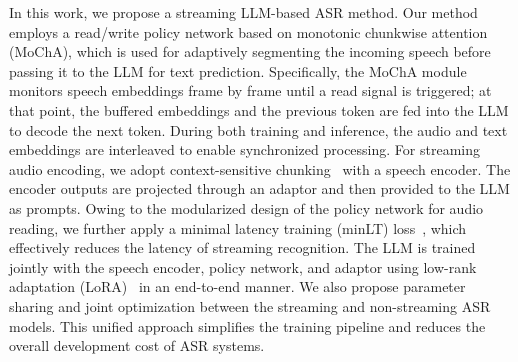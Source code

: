 \documentclass{article}
\begin{document}
In this work, we propose a streaming LLM-based ASR method. Our method employs a read/write policy network based on monotonic chunkwise attention (MoChA), which is used for adaptively segmenting the incoming speech before passing it to the LLM for text prediction. Specifically, the MoChA module monitors speech embeddings frame by frame until a read signal is triggered; at that point, the buffered embeddings and the previous token are fed into the LLM to decode the next token. During both training and inference, the audio and text embeddings are interleaved to enable synchronized processing.
For streaming audio encoding, we adopt context-sensitive chunking~\cite{an22_interspeech} with a speech encoder. The encoder outputs are projected through an adaptor and then provided to the LLM as prompts. Owing to the modularized design of the policy network for audio reading, we further apply a minimal latency training (minLT) loss~\cite{inaguma2020minimum}, which effectively reduces the latency of streaming recognition.
The LLM is trained jointly with the speech encoder, policy network, and adaptor using low-rank adaptation (LoRA)~\cite{hu2022lora} in an end-to-end manner. We also propose parameter sharing and joint optimization between the streaming and non-streaming ASR models. This unified approach simplifies the training pipeline and reduces the overall development cost of ASR systems.
\end{document}
